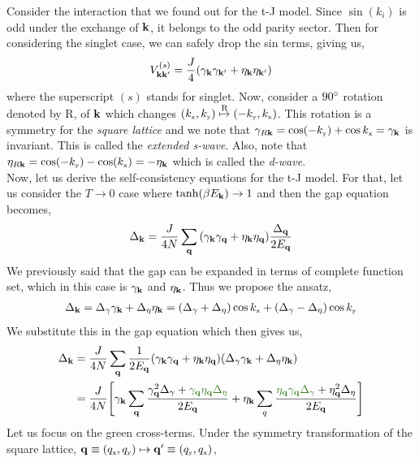 \documentclass{article}
\newcommand{\tund}[1]{_{\text{\tiny #1}}}
\newcommand{\vk}{\vb{k}}
\newcommand{\vkd}{\vb{k}'}
\newcommand{\ek}{\eta_{\vk}}
\newcommand{\gk}{\gamma_{\vk}}
\begin{document}
Consider the interaction that we found out for the t-J model. Since $\sin(k_i)$ is odd under the exchange of $\vk$, it belongs to the odd parity sector. Then for considering the singlet case, we can safely drop the sin terms, giving us,
\begin{equation}
    V_{\vk\vkd}^{(s)} = \frac{J}{4}\qty(\gk\gamma_{\vkd}+\ek\eta_{\vkd})
\end{equation}
where the superscript $(s)$ stands for singlet. Now, consider a $90\degree$ rotation denoted by $\mathrm{R}$, of $\vk$ which changes $(k\tund{x},k\tund{y})\overset{\mathrm{R}}{\mapsto} (-k\tund{y}, k\tund{x})$. This rotation is a symmetry for the \textit{square lattice} and we note that $\gamma_{R\vk} = \cos(-k\tund{y}) + \cos k\tund{x} = \gk $ is invariant. This is called the \textit{extended s-wave}. Also, note that $\eta_{R\vk} = \cos(-k\tund{y}) - \cos(k\tund{x}) = -\ek$ which is called the \textit{d-wave}.  \\[0.3cm]
Now, let us derive the self-consistency equations for the t-J model. For that, let us consider the $T\to 0$ case where $\tanh(\beta E_{\vk})\to 1$ and then the gap equation becomes,
\begin{equation}
    \Delta_{\vk} = \frac{J}{4N} \sum\limits_{\vb{q}}\qty(\gk \gamma_{\vb{q}} +\ek \eta_{\vb{q}} ) \frac{\Delta_{\vb{q}}}{2E_{\vb{q}}}
\end{equation}
We previously said that the gap can be expanded in terms of complete function set, which in this case is $\gk$ and $\ek$. Thus we propose the ansatz, 
\begin{align}
    \Delta_{\vk} = \Delta_{\gamma} \gk + \Delta_{\eta}\ek = (\Delta_{\gamma}+\Delta_{\eta})\cos k\tund{x} + (\Delta_{\gamma}-\Delta_{\eta})\cos k\tund{y}
\end{align}
We substitute this in the gap equation which then gives us,
\begin{align}
    \Delta_{\vk} &=\frac{J}{4N}\sum\limits_{\vb{q}} \frac{1}{2E_{\vb{q}}}\qty(\gk \gamma_{\vb{q}} +\ek \eta_{\vb{q}} ) \qty(\Delta_{\gamma} \gk + \Delta_{\eta}\ek) \\
    &=\frac{J}{4N}\qty[\gk \sum\limits_{\vb{q}} \frac{\gamma_{\vb{q}}^2\Delta_{\gamma} + \mathcolor{OliveGreen}{\gamma_{\vb{q}}\eta_{\vb{q}}\Delta_{\eta}}}{2E_{\vb{q}}} + \ek\sum\limits_{q}\frac{\mathcolor{OliveGreen}{\eta_{\vb{q}}\gamma_{\vb{q}} \Delta_{\gamma}} + \eta_{\vb{q}}^2\Delta_{\eta}}{2E_{\vb{q}}}]
\end{align}
Let us focus on the green cross-terms. Under the symmetry transformation of the square lattice, $\vb{q}\equiv (q\tund{x}, q\tund{y}) \mapsto \vb{q}' \equiv (q\tund{y}, q\tund{x})$,
\end{document}
